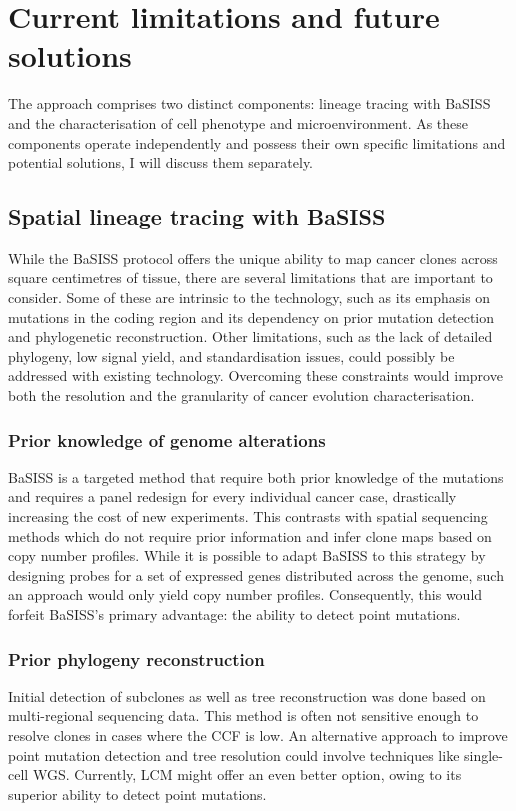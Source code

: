 \section{Current limitations and future solutions}

The approach comprises two distinct components: lineage tracing with \ac{BaSISS} and the characterisation of cell phenotype and microenvironment. As these components operate independently and possess their own specific limitations and potential solutions, I will discuss them separately.

\subsection{Spatial lineage tracing with \acs{BaSISS}}

While the \ac{BaSISS} protocol offers the unique ability to map cancer clones across square centimetres of tissue, there are several limitations that are important to consider. Some of these are intrinsic to the technology, such as its emphasis on mutations in the coding region and its dependency on prior mutation detection and phylogenetic reconstruction. Other limitations, such as the lack of detailed phylogeny, low signal yield, and standardisation issues, could possibly be addressed with existing technology. Overcoming these constraints would improve both the resolution and the granularity of cancer evolution characterisation. 

\subsubsection*{Prior knowledge of genome alterations}

\ac{BaSISS} is a targeted method that require both prior knowledge of the mutations and requires a panel redesign for every individual cancer case, drastically increasing the cost of new experiments. This contrasts with spatial sequencing methods \parencite{Zhao2022-xd,Erickson2022-zh} which do not require prior information and infer clone maps based on copy number profiles. While it is possible to adapt \ac{BaSISS} to this strategy by designing probes for a set of expressed genes distributed across the genome, such an approach would only yield copy number profiles. Consequently, this would forfeit \ac{BaSISS}'s primary advantage: the ability to detect point mutations.

\subsubsection*{Prior phylogeny reconstruction}
Initial detection of subclones as well as tree reconstruction was done based on multi-regional sequencing data. This method is often not sensitive enough to resolve clones in cases where the \ac{CCF} is low. An alternative approach to improve point mutation detection and tree resolution could involve techniques like single-cell \ac{WGS}. Currently, \ac{LCM} might offer an even better option, owing to its superior ability to detect point mutations.

